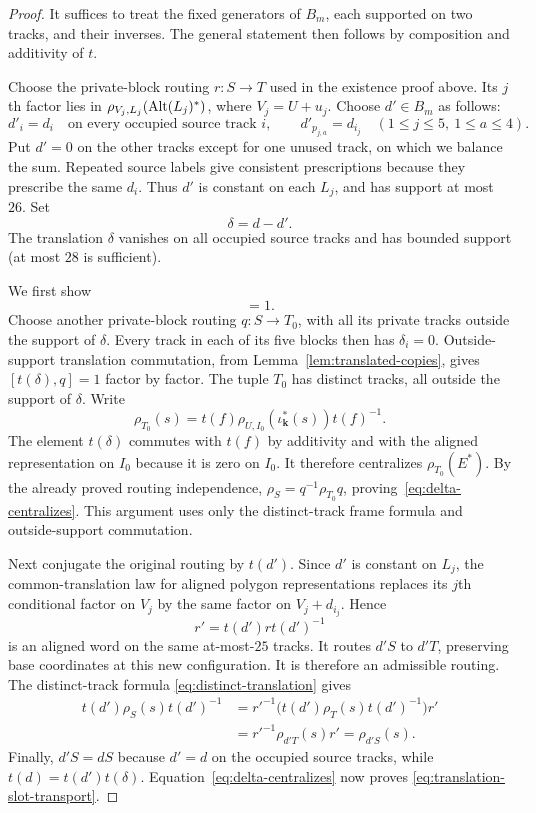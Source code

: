 \begin{proof}
It suffices to treat the fixed generators of $B_m$, each supported on
two tracks, and their inverses.  The general statement then follows by
composition and additivity of $t$.

Choose the private-block routing $r:S\to T$ used in the existence proof
above.  Its $j$th factor lies in $\rho_{V_j,L_j}(\operatorname{Alt}(L_j)^\ast)$, where
$V_j=U+u_j$.  Choose $d'\in B_m$ as follows:
\begin{equation}
 d'_i=d_i\quad\text{on every occupied source track }i,
 \qquad d'_{p_{j,a}}=d_{i_j}\quad(1\leq j\leq5,\ 1\leq a\leq4).
 \label{eq:blockwise-translation}
\end{equation}
Put $d'=0$ on the other tracks except for one unused track, on which
we balance the sum.  Repeated source labels give consistent prescriptions
because they prescribe the same $d_i$.  Thus $d'$ is constant on each
$L_j$, and has support at most $26$.  Set
\[
 \delta=d-d'.
\]
The translation $\delta$ vanishes on all occupied source tracks and has
bounded support (at most $28$ is sufficient).

We first show
\begin{equation}
 [t(\delta),\rho_S(E^\ast)]=1.
 \label{eq:delta-centralizes}
\end{equation}
Choose another private-block routing $q:S\to T_0$, with all its private
tracks outside the support of $\delta$.  Every track in each of its
five blocks then has $\delta_i=0$.  Outside-support translation
commutation, from Lemma~\ref{lem:translated-copies}, gives
$[t(\delta),q]=1$ factor by factor.  The tuple $T_0$ has distinct tracks,
all outside the support of $\delta$.  Write
\[
 \rho_{T_0}(s)=t(f)\rho_{U,I_0}
       (\iota_{\boldsymbol k}^\ast(s))t(f)^{-1}.
\]
The element $t(\delta)$ commutes with $t(f)$ by additivity and with the
aligned representation on $I_0$ because it is zero on $I_0$.
It therefore centralizes $\rho_{T_0}(E^\ast)$.  By the already proved
routing independence,
$\rho_S=q^{-1}\rho_{T_0}q$, proving~\eqref{eq:delta-centralizes}.
This argument uses only the distinct-track frame formula and
outside-support commutation.

Next conjugate the original routing by $t(d')$.  Since $d'$ is constant
on $L_j$, the common-translation law for aligned polygon representations
replaces its $j$th conditional factor on $V_j$ by the same factor on
$V_j+d_{i_j}$.  Hence
\[
 r'=t(d')rt(d')^{-1}
\]
is an aligned word on the same at-most-$25$ tracks.  It routes $d'S$
to $d'T$, preserving base coordinates at this new configuration.  It is
therefore an admissible routing.  The distinct-track formula
\eqref{eq:distinct-translation} gives
\[
 \begin{split}
 t(d')\rho_S(s)t(d')^{-1}
 &=r'^{-1}\bigl(t(d')\rho_T(s)t(d')^{-1}\bigr)r'\\
 &=r'^{-1}\rho_{d'T}(s)r'
 =\rho_{d'S}(s).
 \end{split}
\]
Finally, $d'S=dS$ because $d'=d$ on the occupied source tracks, while
$t(d)=t(d')t(\delta)$.  Equation~\eqref{eq:delta-centralizes} now proves
\eqref{eq:translation-slot-transport}.
\end{proof}

